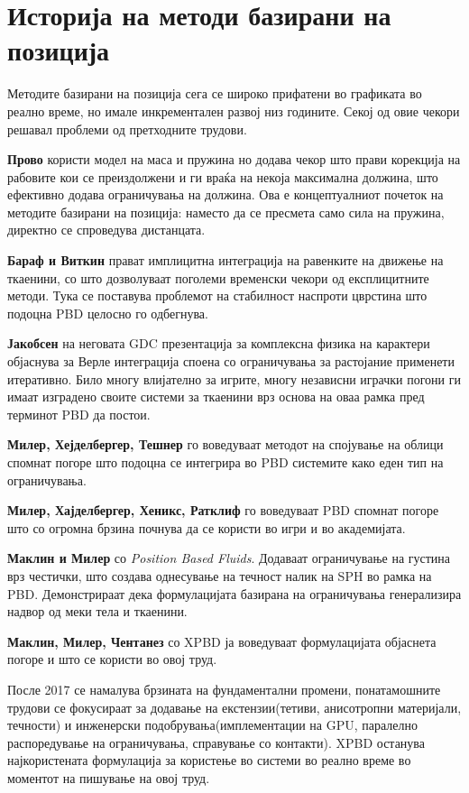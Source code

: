 \section{Историја на методи базирани на позиција}
Методите базирани на позиција сега се широко прифатени во графиката во реално време, но имале инкрементален развој низ годините. Секој од овие чекори решавал проблеми од претходните трудови.

\textbf{Прово}\cite{Provot1995DeformationCI} користи модел на маса и пружина но додава чекор што прави корекција на рабовите кои се преиздолжени и ги враќа на некоја максимална должина, што ефективно додава ограничувања на должина. Ова е концептуалниот почеток на методите базирани на позиција: наместо да се пресмета само сила на пружина, директно се спроведува дистанцата.

\textbf{Бараф и Виткин}\cite{BaraffDavidWitkin1998} прават имплицитна интеграција на равенките на движење на ткаенини, со што дозволуваат поголеми временски чекори од експлицитните методи. Тука се поставува проблемот на стабилност наспроти цврстина што подоцна PBD целосно го одбегнува.

\textbf{Јакобсен}\cite{jakobsen2001advanced} на неговата GDC презентација за комплексна физика на карактери објаснува за Верле интеграција споена со ограничувања за растојание применети итеративно. Било многу влијателно за игрите, многу независни играчки погони ги имаат изградено своите системи за ткаенини врз основа на оваа рамка пред терминот PBD да постои.

\textbf{Милер, Хејделбергер, Тешнер}\cite{ShapeMatching} го воведуваат методот на спојување на облици спомнат погоре што подоцна се интегрира во PBD системите како еден тип на ограничувања.

\textbf{Милер, Хајделбергер, Хеникс, Ратклиф}\cite{pbd} го воведуваат PBD спомнат погоре што со огромна брзина почнува да се користи во игри и во академијата.

\textbf{Маклин и Милер}\cite{macklin2013position} со \textit{Position Based Fluids}. Додаваат ограничување на густина врз честички, што создава однесување на течност налик на SPH во рамка на PBD. Демонстрираат дека формулацијата базирана на ограничувања генерализира надвор од меки тела и ткаенини.

\textbf{Маклин, Милер, Чентанез}\cite{macklin2016xpbd} со XPBD ја воведуваат формулацијата објаснета погоре и што се користи во овој труд.

После 2017 се намалува брзината на фундаментални промени, понатамошните трудови се фокусираат за додавање на екстензии(тетиви, анисотропни материјали, течности) и инженерски подобрувања(имплементации на GPU, паралелно распоредување на ограничувања, справување со контакти). XPBD останува најкористената формулација за користење во системи во реално време во моментот на пишување на овој труд.

